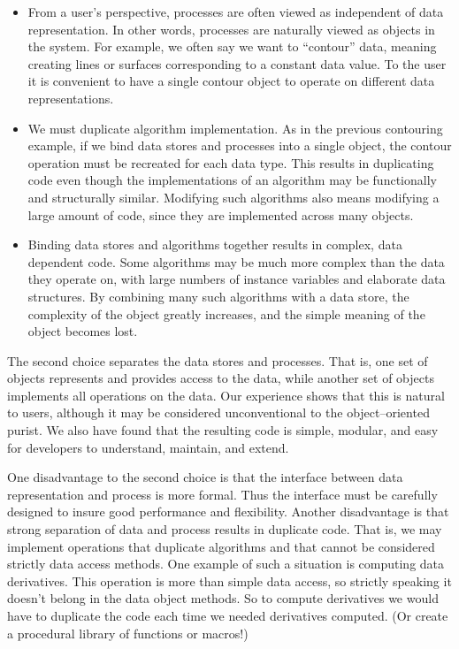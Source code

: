 \begin{itemize}

\item From a user's perspective, processes are often viewed as independent of data representation. In other words, processes are naturally viewed as objects in the system. For example, we often say we want to ``contour'' data, meaning creating lines or surfaces corresponding to a constant data value. To the user it is convenient to have a single contour object to operate on different data representations.

\item We must duplicate algorithm implementation. As in the previous contouring example, if we bind data stores and processes into a single object, the contour operation must be recreated for each data type. This results in duplicating code even though the implementations of an algorithm may be functionally and structurally similar. Modifying such algorithms also means modifying a large amount of code, since they are implemented across many objects.

\item Binding data stores and algorithms together results in complex, data dependent code. Some algorithms may be much more complex than the data they operate on, with large numbers of instance variables and elaborate data structures. By combining many such algorithms with a data store, the complexity of the object greatly increases, and the simple meaning of the object becomes lost.

\end{itemize}

The second choice separates the data stores and processes. That is, one set of objects represents and provides access to the data, while another set of objects implements all operations on the data. Our experience shows that this is natural to users, although it may be considered unconventional to the object--oriented purist. We also have found that the resulting code is simple, modular, and easy for developers to understand, maintain, and extend.

One disadvantage to the second choice is that the interface between data representation and process is more formal. Thus the interface must be carefully designed to insure good performance and flexibility. Another disadvantage is that strong separation of data and process results in duplicate code. That is, we may implement operations that duplicate algorithms and that cannot be considered strictly data access methods. One example of such a situation is computing data derivatives. This operation is more than simple data access, so strictly speaking it doesn't belong in the data object methods. So to compute derivatives we would have to duplicate the code each time we needed derivatives computed. (Or create a procedural library of functions or macros!)

